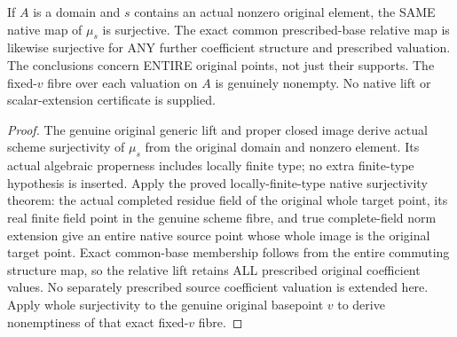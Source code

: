 \begin{theorem}
\label{scheme:paper-rees-native-surjective}
\leanok
{}
If $A$ is a domain and $s$ contains an actual nonzero original element, the
SAME native map of $\mu_s$ is surjective. The exact common prescribed-base
relative map is likewise surjective for ANY further coefficient structure
and prescribed valuation. The conclusions concern ENTIRE original points,
not just their supports. The fixed-$v$ fibre over each valuation on $A$ is genuinely nonempty.
No native lift or scalar-extension certificate is supplied.
\end{theorem}
\begin{proof}
The genuine original generic lift and proper closed image derive actual
scheme surjectivity of $\mu_s$ from the original domain and nonzero element.
Its actual algebraic properness includes locally finite type; no extra
finite-type hypothesis is inserted. Apply the proved locally-finite-type
native surjectivity theorem: the actual completed residue field of the
original whole target point, its real finite field point in the genuine
scheme fibre, and true complete-field norm extension give an entire native
source point whose whole image is the original target point. Exact
common-base membership follows from the entire commuting structure map,
so the relative lift retains ALL prescribed original coefficient values.
No separately prescribed source coefficient valuation is extended here.
Apply whole surjectivity to the genuine original basepoint $v$ to derive
nonemptiness of that exact fixed-$v$ fibre.
\end{proof}

